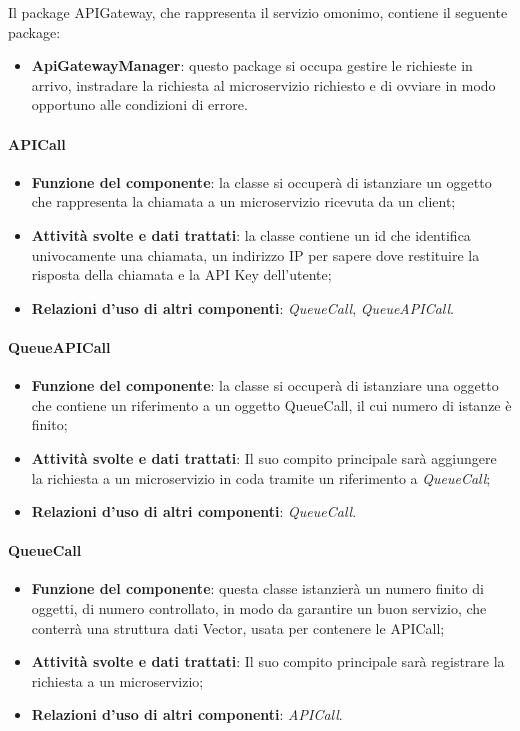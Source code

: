 Il package APIGateway, che rappresenta il servizio omonimo, contiene il seguente package:
\begin{itemize}
	\item \textbf{ApiGatewayManager}: questo package si occupa gestire le richieste in arrivo, instradare la richiesta al microservizio richiesto e di ovviare in modo opportuno alle condizioni di errore.
\end{itemize}

\paragraph{APICall}
\begin{itemize}
	\item \textbf{Funzione del componente}: la classe si occuper\`{a} di istanziare un oggetto che rappresenta la chiamata a un microservizio ricevuta da un client;
	\item \textbf{Attivit\`{a} svolte e dati trattati}: la classe contiene un id che identifica univocamente una chiamata, un indirizzo IP per sapere dove restituire la risposta della chiamata e la API Key dell'utente;
	\item \textbf{Relazioni d'uso di altri componenti}: \textit{QueueCall}, \textit{QueueAPICall}.
\end{itemize}

\paragraph{QueueAPICall}
\begin{itemize}
	\item \textbf{Funzione del componente}: la classe si occuper\`{a} di istanziare una oggetto che contiene un riferimento a un oggetto QueueCall, il cui numero di istanze \`{e} finito;
	\item \textbf{Attivit\`{a} svolte e dati trattati}:  Il suo compito principale sar\`{a} aggiungere la richiesta a un microservizio in coda tramite un riferimento a \textit{QueueCall};
	\item \textbf{Relazioni d'uso di altri componenti}: \textit{QueueCall}.
\end{itemize}

\paragraph{QueueCall}
\begin{itemize}
	\item \textbf{Funzione del componente}: questa classe istanzier\`{a} un numero finito di oggetti, di numero controllato, in modo da garantire un buon servizio, che conterr\`{a} una struttura dati Vector, usata per contenere le APICall;
	\item \textbf{Attivit\`{a} svolte e dati trattati}:  Il suo compito principale sar\`{a} registrare la richiesta a un microservizio;
	\item \textbf{Relazioni d'uso di altri componenti}: \textit{APICall}.
\end{itemize}

